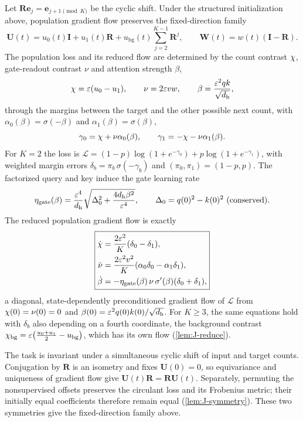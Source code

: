 \begin{proposition}
\label{prop:reduced-transition}
Let $\mathbf R\bm e_j=\bm e_{j+1\pmod K}$ be the cyclic shift. Under the structured initialization above, population gradient flow
preserves the fixed-direction family
\[
 \mathbf U(t)=u_0(t)\mathbf I+u_1(t)\mathbf R
 +u_{\mathrm{bg}}(t)\sum_{j=2}^{K-1}\mathbf R^j,\qquad
 \mathbf W(t)=w(t)(\mathbf I-\mathbf R).
\]
The population loss and its reduced flow are determined by the count contrast $\chi$, gate-readout contrast $\nu$ and attention
strength $\beta$,
\[
 \chi=\varepsilon(u_0-u_1),\qquad \nu=2\varepsilon vw,\qquad \beta=\frac{\varepsilon^2qk}{\sqrt{d_{\mathrm h}}},
\]
through the margins between the target and the other possible next count, with $\alpha_0(\beta)=\sigma(-\beta)$ and $\alpha_1(\beta)=\sigma(\beta)$,
\[
 \gamma_0=\chi+\nu \alpha_0(\beta),\qquad \gamma_1=-\chi-\nu \alpha_1(\beta).
\]
For $K=2$ the loss is $\mathcal L=(1-p)\log(1+e^{-\gamma_0})+p\log(1+e^{-\gamma_1})$, with weighted margin errors
$\delta_b=\pi_b\,\sigma(-\gamma_b)$ and $(\pi_0,\pi_1)=(1-p,p)$. The factorized query and key induce the gate learning rate
\[
 \eta_{\mathrm{gate}}(\beta)=\frac{\varepsilon^4}{d_{\mathrm h}}
 \sqrt{\Delta_0^2+\frac{4d_{\mathrm h}\beta^2}{\varepsilon^4}},\qquad \Delta_0=q(0)^2-k(0)^2\ \text{(conserved)}.
\]
The reduced population gradient flow is exactly
\begin{equation}
 \boxed{\begin{aligned}
 \dot {\chi}&=\frac{2\varepsilon^2}{K}(\delta_0-\delta_1),\\
 \dot \nu&=\frac{2\varepsilon^2v^2}{K}(\alpha_0\delta_0-\alpha_1\delta_1),\\
 \dot \beta&=-\eta_{\mathrm{gate}}(\beta)\,\nu\,\sigma'(\beta)(\delta_0+\delta_1),
 \end{aligned}}
 \label{eq:reduced-transition}
\end{equation}
a diagonal, state-dependently preconditioned gradient flow of $\mathcal L$ from $\chi(0)=\nu(0)=0$ and
$\beta(0)=\varepsilon^2q(0)k(0)/\sqrt{d_{\mathrm h}}$. For $K\ge3$, the same equations hold with $\delta_b$ also depending on a fourth
coordinate, the background contrast $\chi_{\mathrm{bg}}=\varepsilon\bigl(\frac{u_0+u_1}{2}-u_{\mathrm{bg}}\bigr)$, which has its own flow
(\cref{lem:J-reduce}).
\end{proposition}

The task is invariant under a simultaneous cyclic shift of input and target counts. Conjugation by $\mathbf R$ is an isometry
and fixes $\mathbf U(0)=0$, so equivariance and uniqueness of gradient flow give $\mathbf U(t)\mathbf R=\mathbf R\mathbf U(t)$.
Separately, permuting the nonsupervised offsets preserves the circulant loss and its Frobenius metric; their initially equal
coefficients therefore remain equal (\cref{lem:J-symmetry}). These two symmetries give the fixed-direction family above.

